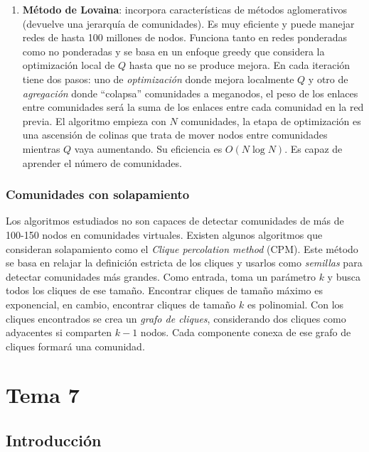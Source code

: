 \documentclass[10pt,spanish, landscape, twocolumn]{article}
\begin{document}
\begin{description}
\begin{enumerate}[\color{temaseis}{$\longrightarrow$}]
        \item \textbf{\textcolor{temaseis}{Método de Lovaina}}: incorpora características de métodos aglomerativos (devuelve una jerarquía de comunidades). Es muy eficiente y puede manejar redes de hasta 100 millones de nodos. Funciona tanto en redes ponderadas como no ponderadas y se basa en un enfoque greedy que considera la optimización local de $Q$ hasta que no se produce mejora. En cada iteración tiene dos pasos: uno de \textit{\textcolor{temaseis}{optimización}} donde mejora localmente $Q$ y otro de \textit{\textcolor{temaseis}{agregación}} donde ``colapsa'' comunidades a meganodos, el peso de los enlaces entre comunidades será la suma de los enlaces entre cada comunidad en la red previa. El algoritmo empieza con $N$ comunidades, la etapa de optimización es una ascensión de colinas que trata de mover nodos entre comunidades mientras $Q$ vaya aumentando. Su eficiencia es $O(N \log N)$. Es capaz de aprender el número de comunidades.
    \end{enumerate}
\end{description}

\subsubsection{\textcolor{temaseis}Comunidades con solapamiento}
Los algoritmos estudiados no son capaces de detectar comunidades de más de 100-150 nodos en comunidades virtuales. Existen algunos algoritmos que consideran solapamiento como el \textit{\textcolor{temaseis}{Clique percolation method}} (CPM). Este método se basa en relajar la definición estricta de los cliques y usarlos como \textit{\textcolor{temaseis}{semillas}} para detectar comunidades más grandes. Como entrada, toma un parámetro $k$ y busca todos los cliques de ese tamaño. Encontrar cliques de tamaño máximo es exponencial, en cambio, encontrar cliques de tamaño $k$ es polinomial. Con los cliques encontrados se crea un \textit{\textcolor{temaseis}{grafo de cliques}}, considerando dos cliques como adyacentes si comparten $k-1$ nodos. Cada componente conexa de ese grafo de cliques formará una comunidad.

\newpage
\section{\textcolor{temasiete}{Tema 7}}


\subsection{\textcolor{temasiete}Introducción}
\end{document}
